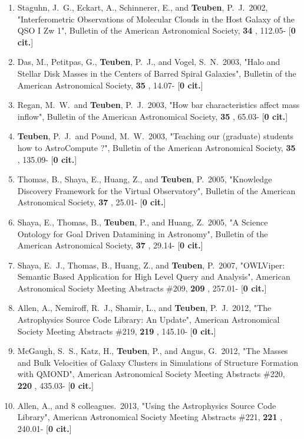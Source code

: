 \documentclass[11pt,letterpaper]{article}
\begin{document}
\begin{enumerate}[resume,label=\textbf{\arabic*}.]
\item  
Staguhn, J.~G., Eckart, A., Schinnerer, E., and {\bf Teuben}, P.~J.\  2002,  
"Interferometric Observations of Molecular Clouds in the Host Galaxy of the 
QSO I Zw 1", Bulletin of the American Astronomical Society,  {\bf 34} , 
112.05- [{\bf 0 cit.}] 
\item  
Das, M., Petitpas, G., {\bf Teuben}, P.~J., and Vogel, S.~N.\  2003,  "Halo and 
Stellar Disk Masses in the Centers of Barred Spiral Galaxies", Bulletin of 
the American Astronomical Society,  {\bf 35} , 14.07- [{\bf 0 cit.}] 

\item  
Regan, M.~W.~and {\bf Teuben}, P.~J.\  2003,  "How bar characteristics affect 
mass inflow", Bulletin of the American Astronomical Society,  {\bf 35} , 
65.03- [{\bf 0 cit.}] 

\item  
{\bf Teuben}, P.~J.~and Pound, M.~W.\  2003,  "Teaching our (graduate) students 
how to AstroCompute ?", Bulletin of the American Astronomical Society,  
{\bf 35} , 135.09- [{\bf 0 cit.}] 
\item  
Thomas, B., Shaya, E., Huang, Z., and {\bf Teuben}, P.\  2005,  "Knowledge 
Discovery Framework for the Virtual Observatory", Bulletin of the American 
Astronomical Society,  {\bf 37} , 25.01- [{\bf 0 cit.}] 

\item  
Shaya, E., Thomas, B., {\bf Teuben}, P., and Huang, Z.\  2005,  "A Science 
Ontology for Goal Driven Datamining in Astronomy", Bulletin of the American 
Astronomical Society,  {\bf 37} , 29.14- [{\bf 0 cit.}] 

\item  
Shaya, E.~J., Thomas, B., Huang, Z., and {\bf Teuben}, P.\  2007,  "OWLViper: 
Semantic Based Application for High Level Query and Analysis", American 
Astronomical Society Meeting Abstracts \#209,  {\bf 209} , 257.01- [{\bf 0 
cit.}] 
\item  
Allen, A., Nemiroff, R.~J., Shamir, L., and {\bf Teuben}, P.~J.\  2012,  "The 
Astrophysics Source Code Library: An Update", American Astronomical Society 
Meeting Abstracts \#219,  {\bf 219} , 145.10- [{\bf 0 cit.}] 

\item  
McGaugh, S.~S., Katz, H., {\bf Teuben}, P., and Angus, G.\  2012,  "The Masses 
and Bulk Velocities of Galaxy Clusters in Simulations of Structure 
Formation with QMOND", American Astronomical Society Meeting Abstracts 
\#220,  {\bf 220} , 435.03- [{\bf 0 cit.}] 
\item  
Allen, A., and 8 colleagues.\  2013,  "Using the Astrophysics Source Code 
Library", American Astronomical Society Meeting Abstracts \#221,  {\bf 221} 
, 240.01- [{\bf 0 cit.}] 


\end{enumerate}
\end{document}
